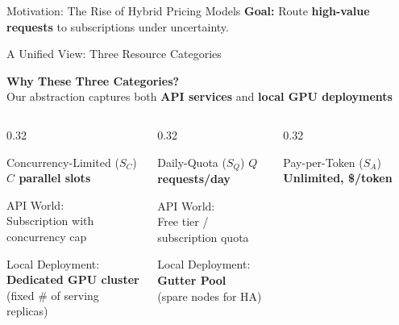 \documentclass[aspectratio=169,10pt]{beamer}
\begin{document}
\begin{frame}{Motivation: The Rise of Hybrid Pricing Models}
    \vspace{0.2cm}
    \centering
    \textbf{Goal:} Route \textbf{high-value requests} to subscriptions under uncertainty.
\end{frame}

\begin{frame}{A Unified View: Three Resource Categories}
\begin{center}
\textcolor{icmlblue}{\textbf{Why These Three Categories?}}\\[0.3cm]
\small Our abstraction captures both \textbf{API services} and \textbf{local GPU deployments}
\end{center}

\vspace{0.3cm}

\begin{columns}[T]
\begin{column}{0.32\textwidth}
\begin{block}{Concurrency-Limited ($S_C$)}
\centering
\textbf{$C$ parallel slots}
\vspace{0.2cm}

\footnotesize
\textcolor{icmlblue}{API World:}\\
Subscription with concurrency cap

\vspace{0.2cm}
\textcolor{icmlgreen}{Local Deployment:}\\
\textbf{Dedicated GPU cluster}\\
(fixed \# of serving replicas)
\end{block}
\end{column}

\begin{column}{0.32\textwidth}
\begin{block}{Daily-Quota ($S_Q$)}
\centering
\textbf{$Q$ requests/day}
\vspace{0.2cm}

\footnotesize
\textcolor{icmlblue}{API World:}\\
Free tier / subscription quota

\vspace{0.2cm}
\textcolor{icmlgreen}{Local Deployment:}\\
\textbf{Gutter Pool}\\
(spare nodes for HA)
\end{block}
\end{column}

\begin{column}{0.32\textwidth}
\begin{block}{Pay-per-Token ($S_A$)}
\centering
\textbf{Unlimited, \$/token}
\vspace{0.2cm}


\end{block}
\end{column}
\end{columns}
\end{frame}
\end{document}
